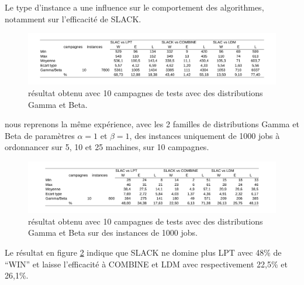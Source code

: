 \documentclass[a4paper,12pt]{report}
\theoremstyle{plain}				%
\theoremstyle{definition}				%
\begin{document}
\bigskip
Le type d'instance a une influence sur le comportement des algorithmes, notamment sur l'efficacité de SLACK.
   
\begin{figure}
{\centering
\includegraphics[width=\columnwidth]{5_Resultat_Reproduction10GammaBeta.pdf}
\caption{résultat obtenu avec 10 campagnes de tests avec des distributions Gamma et Beta.}
\label{fig:resultatReproduction10GammaBeta}
\par}
\end{figure}

\bigskip
nous reprenons la même expérience, avec les 2 familles de distributions 
  Gamma et Beta de paramètres $\alpha = 1$ et $\beta = 1$,
  des instances uniquement de 1000 jobs à ordonnancer sur 5, 10 et 25 machines,
  sur 10 campagnes.

\begin{figure}
{\centering
\includegraphics[width=\columnwidth]{6_Resultat_Reproduction10GammaBeta1000.pdf}
\caption{résultat obtenu avec 10 campagnes de tests avec des distributions Gamma et Beta sur des instances de 1000 jobs.}
\label{fig:resultatReproduction10GammaBeta1000}
\par}
\end{figure}

Le résultat en figure \ref{fig:resultatReproduction10GammaBeta1000} indique que 
  SLACK ne domine plus LPT avec 48\% de ``WIN'' et
  laisse l'efficacité à COMBINE et LDM avec respectivement 22,5\% et 26,1\%.
\end{document}
